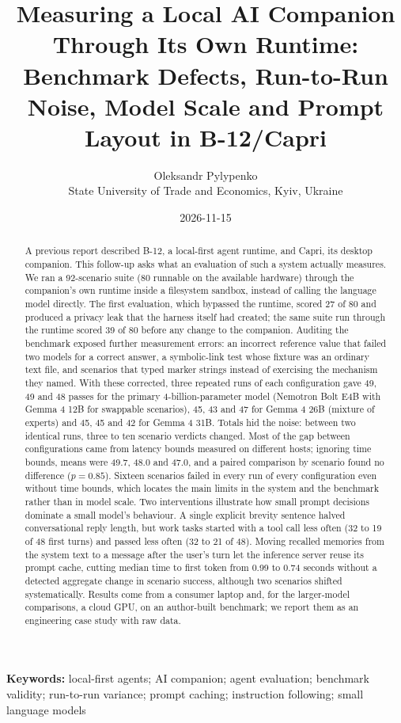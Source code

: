 \documentclass[11pt,a4paper]{article}
\title{Measuring a Local AI Companion Through Its Own Runtime: Benchmark Defects, Run-to-Run Noise, Model Scale and Prompt Layout in B-12/Capri}
\author{Oleksandr Pylypenko\\[4pt]\small State University of Trade and Economics, Kyiv, Ukraine}
\date{2026-11-15}
\begin{document}
\sloppy
\maketitle
\begin{abstract}
A previous report described B-12, a local-first agent runtime, and Capri, its desktop companion. This follow-up asks what an evaluation of such a system actually measures. We ran a 92-scenario suite (80 runnable on the available hardware) through the companion's own runtime inside a filesystem sandbox, instead of calling the language model directly. The first evaluation, which bypassed the runtime, scored 27 of 80 and produced a privacy leak that the harness itself had created; the same suite run through the runtime scored 39 of 80 before any change to the companion. Auditing the benchmark exposed further measurement errors: an incorrect reference value that failed two models for a correct answer, a symbolic-link test whose fixture was an ordinary text file, and scenarios that typed marker strings instead of exercising the mechanism they named. With these corrected, three repeated runs of each configuration gave 49, 49 and 48 passes for the primary 4-billion-parameter model (Nemotron Bolt E4B with Gemma 4 12B for swappable scenarios), 45, 43 and 47 for Gemma 4 26B (mixture of experts) and 45, 45 and 42 for Gemma 4 31B. Totals hid the noise: between two identical runs, three to ten scenario verdicts changed. Most of the gap between configurations came from latency bounds measured on different hosts; ignoring time bounds, means were 49.7, 48.0 and 47.0, and a paired comparison by scenario found no difference ($p=0.85$). Sixteen scenarios failed in every run of every configuration even without time bounds, which locates the main limits in the system and the benchmark rather than in model scale. Two interventions illustrate how small prompt decisions dominate a small model's behaviour. A single explicit brevity sentence halved conversational reply length, but work tasks started with a tool call less often (32 to 19 of 48 first turns) and passed less often (32 to 21 of 48). Moving recalled memories from the system text to a message after the user's turn let the inference server reuse its prompt cache, cutting median time to first token from 0.99 to 0.74 seconds without a detected aggregate change in scenario success, although two scenarios shifted systematically. Results come from a consumer laptop and, for the larger-model comparisons, a cloud GPU, on an author-built benchmark; we report them as an engineering case study with raw data.
\end{abstract}
\noindent\textbf{Keywords:} local-first agents; AI companion; agent evaluation; benchmark validity; run-to-run variance; prompt caching; instruction following; small language models
\end{document}
